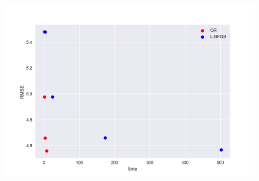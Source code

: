 \documentclass[submit]{harvardml}
\begin{document}
\begin{center}
\includegraphics[scale=0.5]{1.png}
\end{center}
\end{document}
